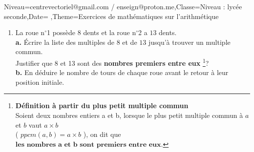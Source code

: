 \documentclass[a4paper,11pt,fleqn]{article}
\begin{document}
\begin{Maquette}[Fiche]{Niveau=centrevectoriel@gmail.com / enseign@proton.me,Classe=Niveau :  lycée seconde,Date=   ,Theme=Exercices de mathématiques  sur l'arithmétique }
\begin{exercice}
\begin{enumerate}[itemsep=2em]
	\item La roue n$^\circ$1 possède $8$ dents et la roue n$^\circ$2 a $13$ dents.\\\textbf {a.}  Écrire la liste des multiples de $8$ et de $13$ jusqu'à trouver un multiple commun.\\Justifier que 8 et 13 sont des \textbf{nombres premiers entre eux} \footnote{\textbf{Définition à partir du plus petit multiple commun} \\ Soient deux nombres entiers a et b, lorsque le plus petit multiple commun à $a$ et $b$ vaut $a \times b$ \\( $ppcm(a,b)=a\times b$ ), on dit que $\textbf{les nombres a et b sont premiers entre eux}$.}?\\\textbf {b.}  En déduire le nombre de tours de chaque roue avant le retour à leur position initiale.
\end{enumerate}
\end{exercice}


\end{Maquette}
\end{document}
